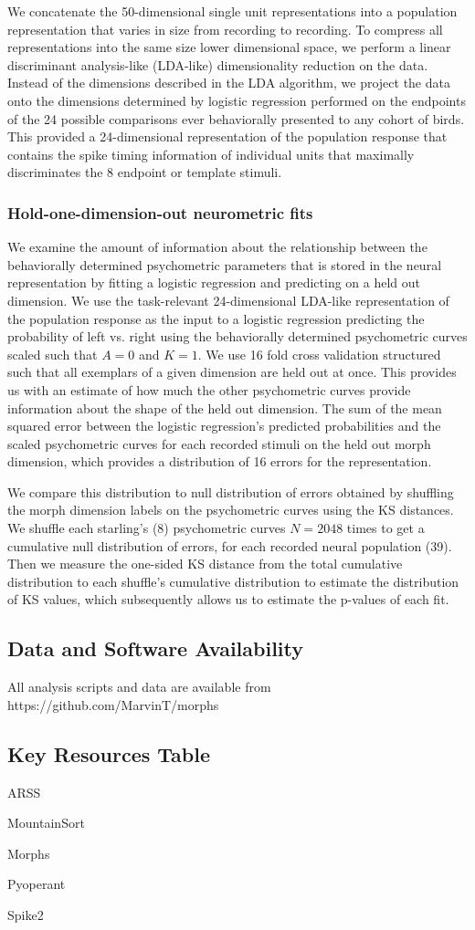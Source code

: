 We concatenate the 50-dimensional single unit representations into a population representation that varies in size from recording to recording. To compress all representations into the same size lower dimensional space, we perform a linear discriminant analysis-like (LDA-like) dimensionality reduction on the data. Instead of the dimensions described in the LDA algorithm, we project the data onto the dimensions determined by logistic regression performed on the endpoints of the 24 possible comparisons ever behaviorally presented to any cohort of birds. This provided a 24-dimensional representation of the population response that contains the spike timing information of individual units that maximally discriminates the 8 endpoint or template stimuli.

\subsubsection{Hold-one-dimension-out neurometric fits}

We examine the amount of information about the relationship between the behaviorally determined psychometric parameters that is stored in the neural representation by fitting a logistic regression and predicting on a held out dimension. We use the task-relevant 24-dimensional LDA-like representation of the population response as the input to a logistic regression predicting the probability of left vs. right using the behaviorally determined psychometric curves scaled such that $A=0$ and $K=1$. We use 16 fold cross validation structured such that all exemplars of a given dimension are held out at once. This provides us with an estimate of how much the other psychometric curves provide information about the shape of the held out dimension. The sum of the mean squared error between the logistic regression's predicted probabilities and the scaled psychometric curves for each recorded stimuli on the held out morph dimension, which provides a distribution of 16 errors for the representation.

We compare this distribution to null distribution of errors obtained by shuffling the morph dimension labels on the psychometric curves using the \ac{KS} distances. We shuffle each starling's (8) psychometric curves $N=2048$ times to get a cumulative null distribution of errors, for each recorded neural population (39). Then we measure the one-sided KS distance from the total cumulative distribution to each shuffle's cumulative distribution to estimate the distribution of KS values, which subsequently allows us to estimate the p-values of each fit.

\subsection{Data and Software Availability}
All analysis scripts and data are available from https://github.com/MarvinT/morphs

\subsection{Key Resources Table}
ARSS

MountainSort

Morphs

Pyoperant

Spike2